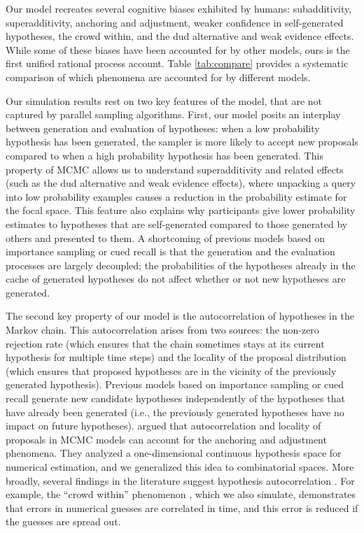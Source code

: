 Our model recreates several cognitive biases exhibited by humans: subadditivity, superadditivity, anchoring and adjustment, weaker confidence in self-generated hypotheses, the crowd within, and the dud alternative and weak evidence effects. While some of these biases have been accounted for by other models, ours is the first unified rational process account. Table \ref{tab:compare} provides a systematic comparison of which phenomena are accounted for by different models.

Our simulation results rest on two key features of the model, that are not captured by parallel sampling algorithms. First, our model posits an interplay between generation and evaluation of hypotheses: when a low probability hypothesis has been generated, the sampler is more likely to accept new proposals compared to when a high probability hypothesis has been generated. This property of MCMC allows us to understand superadditivity and related effects (such as the dud alternative and weak evidence effects), where unpacking a query into low probability examples causes a reduction in the probability estimate for the focal space. This feature also explains why participants give lower probability estimates to hypotheses that are self-generated compared to those generated by others and presented to them. A shortcoming of previous models based on importance sampling \citep{shi10} or cued recall \citep{Thomas2008} is that the generation and the evaluation processes are largely decoupled; the probabilities of the hypotheses already in the cache of generated hypotheses do not affect whether or not new hypotheses are generated.

The second key property of our model is the autocorrelation of hypotheses in the Markov chain. This autocorrelation arises from two sources: the non-zero rejection rate (which ensures that the chain sometimes stays at its current hypothesis for multiple time steps) and the locality of the proposal distribution (which ensures that proposed hypotheses are in the vicinity of the previously generated hypothesis). Previous models based on importance sampling or cued recall generate new candidate hypotheses independently of the hypotheses that have already been generated (i.e., the previously generated hypotheses have no impact on future hypotheses). \citet{lieder2017anchoring} argued that autocorrelation and locality of proposals in MCMC models can account for the anchoring and adjustment phenomena. They analyzed a one-dimensional continuous hypothesis space for numerical estimation, and we generalized this idea to combinatorial spaces. More broadly, several findings in the literature suggest hypothesis autocorrelation \citep{multistability,vul08,Bonawitz2014}. For example, the ``crowd within'' phenomenon \citep{vul08}, which we also simulate, demonstrates that errors in numerical guesses are correlated in time, and this error is reduced if the guesses are spread out.


